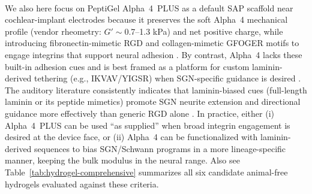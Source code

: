 \documentclass[referee,pdflatex, sn-vancouver-num]{sn-jnl}%
\theoremstyle{thmstyleone}%
\theoremstyle{thmstyletwo}%
\theoremstyle{thmstylethree}%
\begin{document}
We also here focus on PeptiGel\textsuperscript{\textregistered} Alpha~4~PLUS as a default SAP scaffold near cochlear-implant electrodes because it preserves the soft Alpha~4 mechanical profile (vendor rheometry: $G'\!\sim$0.7–1.3 kPa) and net positive charge, while introducing fibronectin-mimetic RGD and collagen-mimetic GFOGER motifs to engage integrins that support neural adhesion \citep{MBG_Alpha4,MBG_Alpha4PLUS,Hersel2003RGDReview,Knight2000GFOGER}. By contrast, Alpha~4 lacks these built-in adhesion cues and is best framed as a platform for custom laminin-derived tethering (e.g., IKVAV/YIGSR) when SGN-specific guidance is desired \citep{Silva2004IKVAV,Evans2007LamininFibronectin}. The auditory literature consistently indicates that laminin-biased cues (full-length laminin or its peptide mimetics) promote SGN neurite extension and directional guidance more effectively than generic RGD alone \citep{Evans2007LamininFibronectin,Relvas2001IntegrinsNervous,Chen2014MicrogroovedLaminin}. In practice, either (i) Alpha~4~PLUS can be used “as supplied” when broad integrin engagement is desired at the device face, or (ii) Alpha~4 can be functionalized with laminin-derived sequences to bias SGN/Schwann programs in a more lineage-specific manner, keeping the bulk modulus in the neural range. Also see Table~\ref{tab:hydrogel-comprehensive} summarizes all six candidate animal-free hydrogels evaluated against these criteria.
\end{document}
